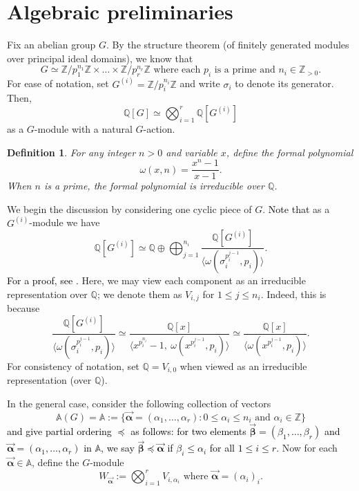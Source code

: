 \documentclass{amsart}
\newcommand{\edit}[1]{\textcolor{black}{#1}}
\newtheorem{definition}[theorem]{Definition}
\numberwithin{equation}{section}
\theoremstyle{remark}
\newcommand{\val}{\vec{\boldsymbol{\alpha}}}
\newcommand{\Z}{\mathbb{Z}}
\newcommand{\A}{\mathbb{A}}
\newcommand{\Q}{\mathbb{Q}}
\theoremstyle{plain} %
\begin{document}
\section{Algebraic preliminaries}
\label{sec: algebraic preliminary}
Fix an abelian group $G$.
By the structure theorem (of finitely generated modules over principal ideal domains), we know that
\[
G \simeq \Z/p_1^{n_1}\Z \times \ldots \times \Z/p_r^{n_r}\Z \text{ where each }p_i \text{ is a prime and }n_i\in \Z_{>0}.
\]
For ease of notation, set $G^{(i)} = \Z/p_i^{n_i}\Z$ and write $\sigma_i$ to denote its generator.
Then,
\[
\Q[G] \simeq \bigotimes_{i=1}^r \Q[G^{(i)}]
\]
as a $G$-module with a natural $G$-action.

\begin{definition}
For any integer $n>0$ and variable $x$, define the formal polynomial
\[
\omega(x,n) = \frac{x^n -1}{x-1}.
\]
When $n$ is a prime, the formal polynomial is irreducible over $\Q$.
\end{definition}

We begin the discussion by considering one cyclic piece of $G$.
\edit{Note that} as a $G^{(i)}$-module we have
\[
\Q[G^{(i)}] \simeq \Q \oplus \bigoplus_{j = 1}^{n_i} \frac{\Q[G^{(i)}]}{\langle \omega(\sigma_i^{p_i^{j - 1}}, p_i)\rangle }.
\]
\edit{For a proof, see \cite[\S21, Exercise~1]{Curtis-Reiner-81}.} Here, we may view each component as an irreducible representation over $\Q$; we denote them as $V_{i,j}$ for $1\leq j \leq n_i$.
Indeed, this is because
\[
\frac{\Q[G^{(i)}]}{\langle \omega(\sigma_i^{p_i^{j - 1}}, p_i) \rangle} \simeq \frac{\Q[x]}{\langle x^{p_i^{n_i}}-1, \ \omega(x^{p_i^{j - 1}}, p_i) \rangle} \simeq \frac{\Q[x]}{\langle \omega(x^{p_i^{j - 1}}, p_i) \rangle} .
\]
For consistency of notation, set $\Q = V_{i,0}$ when viewed as an irreducible representation (over $\Q$).


In the general case, consider the following collection of vectors 
\[
\A(G) = \A := \{\vec{\boldsymbol{\alpha}} = (\alpha_1, \ldots, \alpha_r) \colon 0 \leq \alpha_i \leq n_i \text{ and } \alpha_i \in \Z\}
\]
\edit{and give partial ordering $\preccurlyeq$ as follows: for two elements $\vec{\boldsymbol{\beta}} = (\beta_1, \ldots, \beta_r)$ and $\vec{\boldsymbol{\alpha}} = (\alpha_1, \ldots, \alpha_r)$ in $\A$, we say  $\vec{\boldsymbol{\beta}} \preccurlyeq \vec{\boldsymbol{\alpha}}$ if $\beta_i \leq \alpha_i$ for all $1\leq i \leq r$.
}
Now for each $\val\in \A$, define the $G$-module
\[
W_{\val} := \bigotimes_{i=1}^r V_{i, \alpha_i} \text{ where } \val = (\alpha_i)_i.
\]
\end{document}
